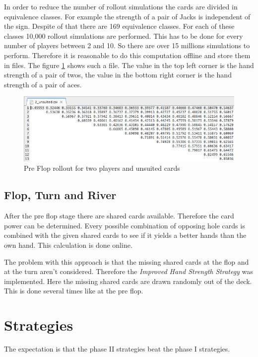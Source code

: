 In order to reduce the number of rollout simulations the cards are divided in equivalence classes. For example the strength of a pair of Jacks is independent of the sign. Despite of that there are 169 equivalence classes. For each of these classes 10,000 rollout simulations are performed. This has to be done for every number of players between 2 and 10. So there are over 15 millions simulations to perform. Therefore it is reasonable to do this computation offline and store them in files. The figure \ref{fig:preflop} shows such a file. The value in the top left corner is the hand strength of a pair of twos, the value in the bottom right corner is the hand strength of a pair of aces.

\begin{figure}[h]
  \centering
  \includegraphics[width=1.0\textwidth]{images/preflop}
  \caption{Pre Flop rollout for two players and unsuited cards}
  \label{fig:preflop}
\end{figure}

\subsection{Flop, Turn and River}
After the pre flop stage there are shared cards available. Therefore the card power can be determined. Every possible combination of opposing hole cards is combined with the given shared cards to see if it yields a better hands than the own hand. This calculation is done online.

The problem with this approach is that the missing shared cards at the flop and at the turn aren't considered. Therefore the \emph{Improved Hand Strength Strategy} was implemented. Here the missing shared cards are drawn randomly out of the deck. This is done several times like at the pre flop.

\section{Strategies}
The expectation is that the phase II strategies beat the phase I strategies.

